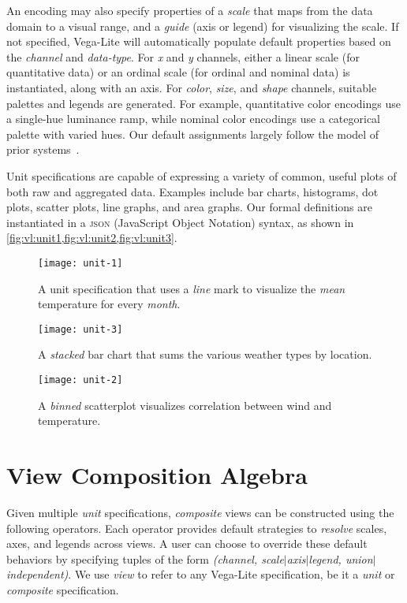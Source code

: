 An encoding may also specify properties of a \emph{scale} that maps from the
data domain to a visual range, and a \emph{guide} (axis or legend) for
visualizing the scale. If not specified, Vega-Lite will automatically populate
default properties based on the \emph{channel} and \emph{data-type}. For \emph
{x} and \emph{y} channels, either a linear scale (for quantitative data) or an
ordinal scale (for ordinal and nominal data) is instantiated, along with an
axis. For \emph{color}, \emph{size}, and \emph{shape} channels, suitable
palettes and legends are generated. For example, quantitative color encodings
use a single-hue luminance ramp, while nominal color encodings use a categorical
palette with varied hues. Our default assignments largely follow the model of
prior systems~\cite{stolte:polaris, voyager}.

Unit specifications are capable of expressing a variety of common, useful plots
of both raw and aggregated data. Examples include bar charts, histograms, dot
plots, scatter plots, line graphs, and area graphs. Our formal definitions are
instantiated in a \textsc{json} (JavaScript Object Notation) syntax, as shown in
\cref{fig:vl:unit1,fig:vl:unit2,fig:vl:unit3}.

\begin{figure}[h!]
\centering
  \texttt{[image: unit-1]}
  \caption{A unit specification that uses a \emph{line} mark to visualize the
  \emph{mean} temperature for every \emph{month}.}
  \label{fig:vl:unit1}
\end{figure}

\begin{figure}[h!]
  \centering
  \texttt{[image: unit-3]}
  \caption{A \emph{stacked} bar chart that sums the various weather types by
  location.}
  \label{fig:vl:unit3}
\end{figure}

\begin{figure}[h!]
  \centering
  \texttt{[image: unit-2]}
  \caption{A \emph{binned} scatterplot visualizes correlation between wind
  and temperature.}
  \label{fig:vl:unit2}
\end{figure}

\section{View Composition Algebra}

Given multiple \emph{unit} specifications, \emph{composite} views can be
constructed using the following operators. Each operator provides default
strategies to \emph{resolve} scales, axes, and legends across views. A user can
choose to override these default behaviors by specifying tuples of the form
\emph{(channel, scale$|$axis$|$legend, union$|$independent)}. We use \emph{view}
to refer to any Vega-Lite specification, be it a \emph{unit} or \emph{composite}
specification.

